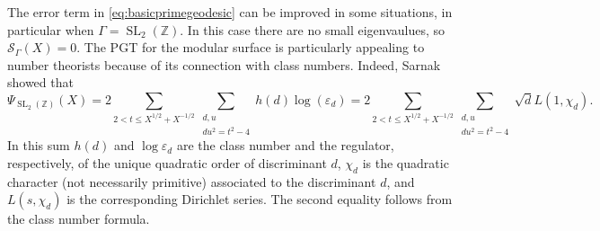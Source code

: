 \documentclass{article}
\theoremstyle{named}
\renewcommand{\S}{\mathcal{S}}
\newcommand{\Z}{\mathbb{Z}}
\DeclareMathOperator{\SL}{SL}
\begin{document}
The error term in \eqref{eq:basicprimegeodesic} can be improved in some situations, in particular when $\Gamma = \SL_2(\Z)$. In this case there are no small eigenvaulues, so $\S_\Gamma(X) = 0$. The PGT for the modular surface is particularly appealing to number theorists because of its connection with class numbers. Indeed, Sarnak showed \cite{sarnak82} that 
\begin{equation}\label{eq:connectiontoclassnumbers}
    \Psi_{\SL_2(\Z)}(X) = 2 \sum_{2 < t \leq X^{1/2} + X^{-1/2}}\sum_{\substack{d, u\\du^2 = t^2 - 4}} h(d) \log(\varepsilon_d) = 2\sum_{2 < t \leq X^{1/2} + X^{-1/2}} \sum_{\substack{d, u\\ du^2 = t^2 - 4}}  \sqrt{d}L(1, \chi_d).
\end{equation}
In this sum $h(d)$ and $\log \varepsilon_d$ are the class number and the regulator, respectively, of the unique quadratic order of discriminant $d$, $\chi_d$ is the quadratic character (not necessarily primitive) associated to the discriminant $d$, and $L(s, \chi_d)$ is the corresponding Dirichlet series. The second equality follows from the class number formula. 
\end{document}

